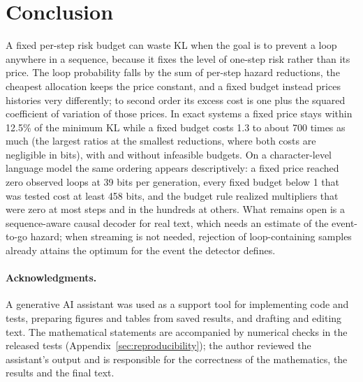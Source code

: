 \documentclass[make,article,submit,pdftex]{Definitions/mdpi}
\providecommand{\acknowledgments}[1]{\paragraph{Acknowledgments.} #1}
\begin{document}
\section{Conclusion}\label{sec:conclusion}
A fixed per-step risk budget can waste KL when the goal is to prevent a loop anywhere in a sequence, because it fixes the level of one-step risk rather than its price. The loop probability falls by the sum of per-step hazard reductions, the cheapest allocation keeps the price constant, and a fixed budget instead prices histories very differently; to second order its excess cost is one plus the squared coefficient of variation of those prices. In exact systems a fixed price stays within 12.5\% of the minimum KL while a fixed budget costs 1.3 to about 700 times as much (the largest ratios at the smallest reductions, where both costs are negligible in bits), with and without infeasible budgets. On a character-level language model the same ordering appears descriptively: a fixed price reached zero observed loops at 39 bits per generation, every fixed budget below 1 that was tested cost at least 458 bits, and the budget rule realized multipliers that were zero at most steps and in the hundreds at others. What remains open is a sequence-aware causal decoder for real text, which needs an estimate of the event-to-go hazard; when streaming is not needed, rejection of loop-containing samples already attains the optimum for the event the detector defines.


\vspace{6pt}
\acknowledgments{A generative AI assistant was used as a support tool for implementing code and tests, preparing figures and tables from saved results, and drafting and editing text. The mathematical statements are accompanied by numerical checks in the released tests (Appendix~\ref{sec:reproducibility}); the author reviewed the assistant's output and is responsible for the correctness of the mathematics, the results and the final text.}
\end{document}
